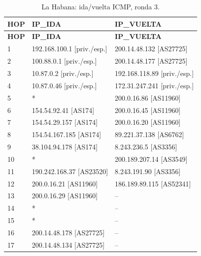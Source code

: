 \begin{longtable}{p{0.95cm}p{7.075cm}p{7.075cm}}
\caption{La Habana: ida/vuelta ICMP, ronda 3.}\label{anexo:vuelta:200.14.48.134:ICMP:3} \\
\toprule
\textbf{HOP} & \textbf{IP\_\allowbreak{}IDA} & \textbf{IP\_\allowbreak{}VUELTA} \\ \midrule
\endfirsthead
\toprule
\textbf{HOP} & \textbf{IP\_\allowbreak{}IDA} & \textbf{IP\_\allowbreak{}VUELTA} \\ \midrule
\endhead
1 & 192.168.100.1 [priv./esp.] & 200.14.48.132 [AS27725] \\
2 & 100.88.0.1 [priv./esp.] & 200.14.48.177 [AS27725] \\
3 & 10.87.0.2 [priv./esp.] & 192.168.118.89 [priv./esp.] \\
4 & 10.87.0.46 [priv./esp.] & 172.31.247.241 [priv./esp.] \\
5 & * & 200.0.16.86 [AS11960] \\
6 & 154.54.92.41 [AS174] & 200.0.16.45 [AS11960] \\
7 & 154.54.29.157 [AS174] & 200.0.16.20 [AS11960] \\
8 & 154.54.167.185 [AS174] & 89.221.37.138 [AS6762] \\
9 & 38.104.94.178 [AS174] & 8.243.236.5 [AS3356] \\
10 & * & 200.189.207.14 [AS3549] \\
11 & 190.242.168.37 [AS23520] & 8.243.191.90 [AS3356] \\
12 & 200.0.16.21 [AS11960] & 186.189.89.115 [AS52341] \\
13 & 200.0.16.29 [AS11960] & -- \\
14 & * & -- \\
15 & * & -- \\
16 & 200.14.48.178 [AS27725] & -- \\
17 & 200.14.48.134 [AS27725] & -- \\
\bottomrule
\end{longtable}
\endgroup
\begingroup
\fontsize{9}{11}\selectfont

